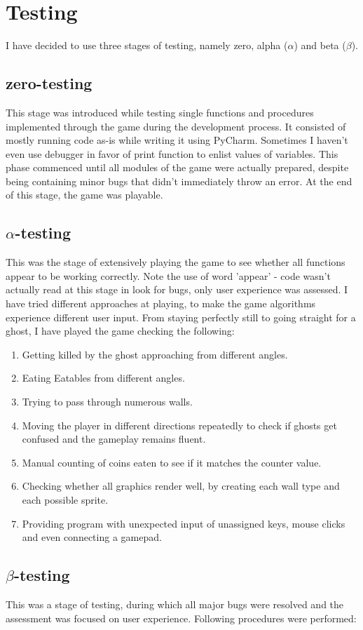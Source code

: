 \documentclass[11pt,a4paper,notitlepage]{report}
\newcommand{\dsubsection}[1]{\FloatBarrier \subsection{#1}}
\begin{document}
		\section{Testing}
			I have decided to use three stages of testing, namely zero, alpha ($\alpha$) and beta ($\beta$).
			\dsubsection{zero-testing}
				This stage was introduced while testing single functions and procedures implemented through the game during the development process. It consisted of mostly running code as-is while writing it using PyCharm. Sometimes I haven't even use debugger in favor of print function to enlist values of variables. This phase commenced until all modules of the game were actually prepared, despite being containing minor bugs that didn't immediately throw an error. At the end of this stage, the game was playable. 
			\dsubsection{$\alpha$-testing}
				This was the stage of extensively playing the game to see whether all functions appear to be working correctly. Note the use of word 'appear' - code wasn't actually read at this stage in look for bugs, only user experience was assessed. I have tried different approaches at playing, to make the game algorithms experience different user input. From staying perfectly still to going straight for a ghost, I have played the game checking the following:
				\begin{enumerate}
					\item
						Getting killed by the ghost approaching from different angles.
					\item
						Eating Eatables from different angles.
					\item
						Trying to pass through numerous walls.
					\item
						Moving the player in different directions repeatedly to check if ghosts get confused and the gameplay remains fluent.
					\item
						Manual counting of coins eaten to see if it matches the counter value.
					\item
						Checking whether all graphics render well, by creating each wall type and each possible sprite.
					\item
						Providing program with unexpected input of unassigned keys, mouse clicks and even connecting a gamepad.
				\end{enumerate}
			\dsubsection{$\beta$-testing}
				This was a stage of testing, during which all major bugs were resolved and the assessment was focused on user experience. Following procedures were performed:
\end{document}

